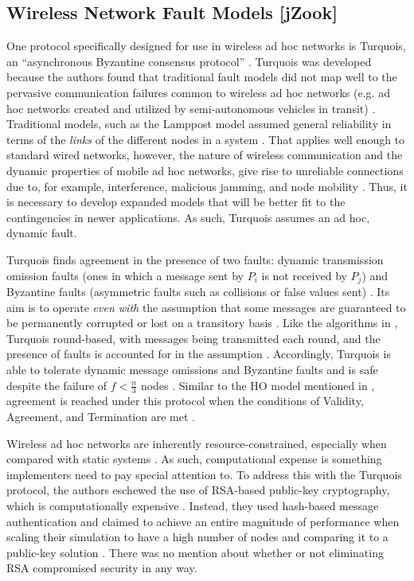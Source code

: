 \documentclass[twoside, conference]{IEEEtran}
\begin{document}
\subsection{Wireless Network Fault Models [jZook]}


One protocol specifically designed for use in wireless ad hoc networks is Turquois, an ``asynchronous Byzantine consensus protocol'' \cite{moniz2013}. Turquois was developed because the authors found that traditional fault models did not map well to the pervasive communication failures common to wireless ad hoc networks (e.g. ad hoc networks created and utilized by semi-autonomous vehicles in transit) \cite{moniz2013}. Traditional models, such as the Lamppost model assumed general reliability in terms of the \textit{links} of the different nodes in a system \cite{moniz2013}. That applies well enough to standard wired networks, however, the nature of wireless communication and the dynamic properties of mobile ad hoc networks, give rise to unreliable connections due to, for example, interference, malicious jamming, and node mobility \cite{moniz2013}. Thus, it is necessary to develop expanded models that will be better fit to the contingencies in newer applications. As such, Turquois assumes an ad hoc, dynamic fault\cite{moniz2013}.

Turquois finds agreement in the presence of two faults: dynamic transmission omission faults (ones in which a message sent by $P_i$ is not received by $P_j$) and Byzantine faults (asymmetric faults such as collisions or false values sent) \cite{moniz2013}. Its aim is to operate \textit{even with} the assumption that some messages are guaranteed to be permanently corrupted or lost on a transitory basis \cite{moniz2013}. Like the algorithms in \cite{bialy}, Turquois round-based, with messages being transmitted each round, and the presence of faults is accounted for in the assumption \cite{moniz2013}. Accordingly, Turquois is able to tolerate dynamic message omissions and Byzantine faults and is safe despite the failure of $f < \frac{n}{3}$ nodes \cite{moniz2013}. Similar to the HO model mentioned in \cite{bialy}, agreement is reached under this protocol when the conditions of Validity, Agreement, and Termination are met \cite{moniz2013}.

Wireless ad hoc networks are inherently resource-constrained, especially when compared with static systems \cite{moniz2013}. As such, computational expense is something implementers need to pay special attention to. To address this with the Turquois protocol, the authors eschewed the use of RSA-based public-key cryptography, which is computationally expensive \cite{moniz}. Instead, they used hash-based message authentication and claimed to achieve an entire magnitude of performance when scaling their simulation to have a high number of nodes and comparing it to a public-key solution \cite{moniz2013}. There was no mention about whether or not eliminating RSA compromised security in any way.
\end{document}
